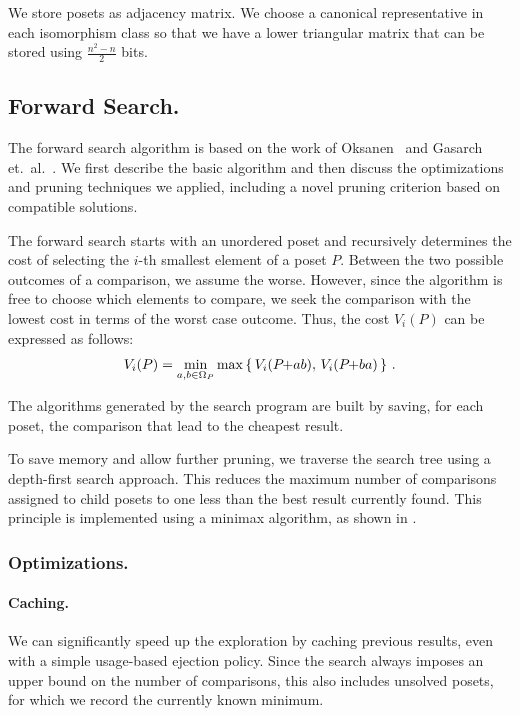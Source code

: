 \documentclass[twoside,leqno,twocolumn]{article}
\newcommand{\pchild}[3]{{#1}\kern-1pt{+}{#2}{#3}}
\begin{document}
We store posets as adjacency matrix.
We choose a canonical representative in each isomorphism class so that we have a lower triangular matrix that can be stored using $\frac{n^2 - n}{2}$ bits.


\subsection{Forward Search.} \label{chapter:forward_search}
The forward search algorithm is based on the work of Oksanen~\cite{Oksanen2006} and Gasarch et.\ al\@.~\cite{Gasarch1996}.
We first describe the basic algorithm and then discuss the optimizations and pruning techniques we applied, including a novel pruning criterion based on compatible solutions.

The forward search starts with an unordered poset and recursively determines the cost of selecting the $i$-th smallest element of a poset $P$.
Between the two possible outcomes of a comparison, we assume the worse.
However, since the algorithm is free to choose which elements to compare, we seek the comparison with the lowest cost in terms of the worst case outcome.
Thus, the cost $V_i(P)$ can be expressed as follows:
\begin{equation}
  V_i(P) = \min_{a,b \in \Omega_P} \max \left\{ \,V_i(\pchild{P}{a}{b}),\, V_i(\pchild{P}{b}{a})\,\right\}\,\text{.}
\end{equation}

The algorithms generated by the search program are built by saving, for each poset, the comparison that lead to the cheapest result.

To save memory and allow further pruning, we traverse the search tree using a depth-first search approach.
This reduces the maximum number of comparisons assigned to child posets to one less than the best result currently found.
This principle is implemented using a minimax algorithm, as shown in .


\subsubsection{Optimizations.}

\paragraph{Caching.}
We can significantly speed up the exploration by caching previous results, even with a simple usage-based ejection policy.
Since the search always imposes an upper bound on the number of comparisons, this also includes unsolved posets, for which we record the currently known minimum.
\end{document}
